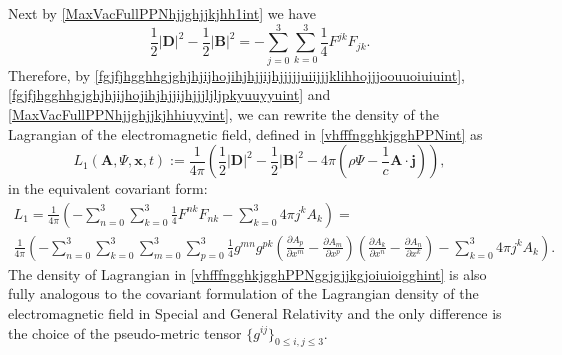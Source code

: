 \documentclass{article}
\theoremstyle{definition}
\theoremstyle{remark}
\renewcommand{\vec}[1]{\mathbf{#1}}
\newcommand{\er}{\eqref}
\newcommand{\er}{\eqref}
\begin{document}
Next by
\er{MaxVacFullPPNhjjghjjkjhh1int} we have
\begin{equation}\label{MaxVacFullPPNhjjghjjkjhhiuyyint}
\frac{1}{2}|\vec D|^2-\frac{1}{2}|\vec
B|^2=-\sum_{j=0}^{3}\sum_{k=0}^{3}\frac{1}{4}F^{jk}F_{jk}.
\end{equation}
Therefore, by
\er{fgjfjhgghhgjghjhjijhojihjhjjijhjjjjjuiijjjklihhojjjoouuoiuiuint},
\er{fgjfjhgghhgjghjhjijhojihjhjjijhjjjljljpkyuuyyuint} and
\er{MaxVacFullPPNhjjghjjkjhhiuyyint}, we can rewrite the density of
the Lagrangian of the electromagnetic field, defined in
\er{vhfffngghkjgghPPNint} as
\begin{equation}\label{vhfffngghkjgghPPNggjgjjkgjoiuiint}
L_1\left(\vec A,\Psi,\vec
x,t\right):=\frac{1}{4\pi}\left(\frac{1}{2}\left|\vec
D\right|^2-\frac{1}{2}\left|\vec
B\right|^2-4\pi\left(\rho\Psi-\frac{1}{c}\vec A\cdot\vec
j\right)\right),
\end{equation}
in the equivalent covariant form:
\begin{multline}\label{vhfffngghkjgghPPNggjgjjkgjoiuioigghint}
L_1=\frac{1}{4\pi}\left(-\sum_{n=0}^{3}\sum_{k=0}^{3}\frac{1}{4}F^{nk}F_{nk}-\sum_{k=0}^{3}4\pi
j^k A_k\right)=\\
\frac{1}{4\pi}\left(-\sum_{n=0}^{3}\sum_{k=0}^{3}\sum_{m=0}^{3}\sum_{p=0}^{3}\frac{1}{4}g^{mn}g^{pk}\left(\frac{\partial
A_p}{\partial x^m}-\frac{\partial A_m}{\partial
x^p}\right)\left(\frac{\partial A_k}{\partial x^n}-\frac{\partial
A_n}{\partial x^k}\right)-\sum_{k=0}^{3}4\pi j^k A_k\right).
\end{multline}
The density of Lagrangian in
\er{vhfffngghkjgghPPNggjgjjkgjoiuioigghint} is also fully analogous
to the covariant formulation of the Lagrangian density of the
electromagnetic field in Special and General Relativity and the only
difference is the choice of the pseudo-metric tensor
$\{g^{ij}\}_{0\leq i,j\leq 3}$.
\end{document}
